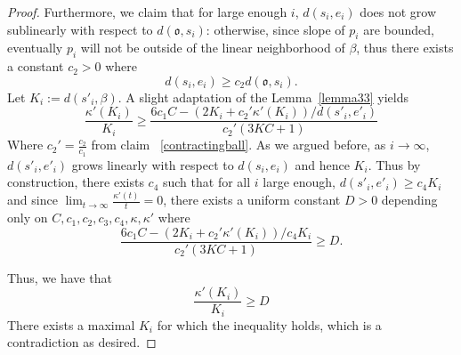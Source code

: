 \documentclass[12 pt]{amsart}
\newcommand{\gothic}{\mathfrak}
\newcommand{\go}{{\gothic o}}
\theoremstyle{definition}
\theoremstyle{remark}
\begin{document}
\begin{proof}

   
Furthermore, we claim that for large enough $i$, 
  $d(s_i, e_i)$ does not grow sublinearly with respect to 
  $d( \go, s_i)$: otherwise, since slope of $p_i$ are bounded, eventually $p_i$ will not be outside of the linear neighborhood of $\beta$, thus there exists a constant $c_2>0$ where
  \[
   d(s_i, e_i) \geq c_2 d(\go, s_i).
  \]
  Let $K_i:= d(s'_i, \beta)$. A slight adaptation of the Lemma~\ref{lemma33} yields 
   \[ \frac{\kappa'(K_i)}{K_i} \geq \frac{6c_1C-(2 K_i +c_2'\kappa'(K_i))/d(s'_i, e'_i)}{c_2'(3KC+1)}\]
   Where $c_2'=\frac{c_2}{c_1}$ from claim ~\ref{contractingball}.\newline
   As we argued before,  as $i \to \infty$,  $d(s'_i, e'_i)$ grows linearly with respect to $d(s_i, e_i)$ and hence $K_i$. Thus by construction, there exists $c_4$ such that for all $i$ large enough, $d(s'_i, e'_i) \geq c_4 K_i$ and since $\lim_{t\to\infty}\frac{\kappa'(t)}{t}=0$, there exists a uniform constant $D>0$ depending only on $C, c_1, c_2, c_3,c_4, \kappa, \kappa'$ where 
  \[
  \frac{6c_1C-(2 K_i +c_2'\kappa'(K_i))/c_4K_i}{c_2'(3KC+1)}\geq D.
  \]
 

  Thus, we have that
  \[\frac{\kappa'(K_i)}{K_i} \geq D
\]
  There exists a maximal $K_i$ for which the inequality holds, which is a contradiction as desired. 

\end{proof}
\end{document}
